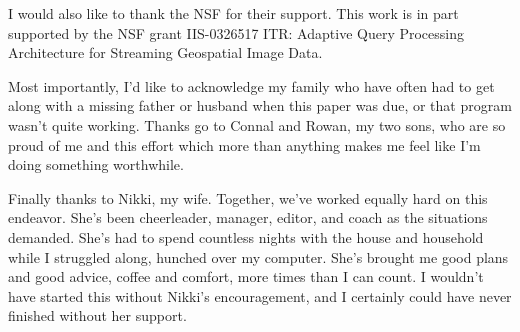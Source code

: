 \documentclass{ucdthesis}       %
\begin{document}
\begin{frontmatter}
\begin{acknowledgments}
  I would also like to thank the \acl{NSF} for their support.  This
  work is in part supported by the NSF grant IIS-0326517 ITR: Adaptive
  Query Processing Architecture for Streaming Geospatial Image Data.

  Most importantly, I'd like to acknowledge my family who have often
  had to get along with a missing father or husband when this paper
  was due, or that program wasn't quite working.  Thanks go to Connal
  and Rowan, my two sons, who are so proud of me and this effort which
  more than anything makes me feel like I'm doing something
  worthwhile.

  Finally thanks to Nikki, my wife.  Together, we've worked equally
  hard on this endeavor.  She's been cheerleader, manager, editor, and
  coach as the situations demanded.  She's had to spend countless
  nights with the house and household while I struggled along, hunched
  over my computer.  She's brought me good plans and good advice,
  coffee and comfort, more times than I can count.  I wouldn't have
  started this without Nikki's encouragement, and I certainly could
  have never finished without her support.

\end{acknowledgments}

\clearpage
\tableofcontents
\listoffigures
\listoftables


\end{frontmatter}
\end{document}
